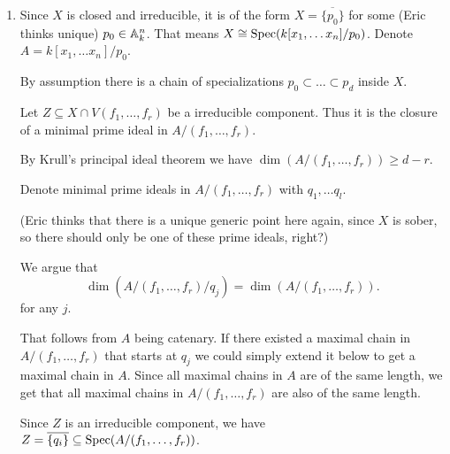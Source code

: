 \newcommand{\sheet}{10}




\maketitle{}

\begin{exercise}{1}
    \begin{enumerate}
        \item{
                Since $X$ is closed and irreducible, it is of the form $X =
                \overline{\{p_0\}}$ for some (Eric thinks unique) $p_0 \in \mathbb{A}^n_k$.
                That means $X \cong \operatorname{Spec}(k[x_1, \dots x_n] / p_0)$.
                Denote $A = k[x_1, \dots x_n] / p_0$.

                By assumption there is a chain of specializations $p_0 \subset
                \dots \subset p_d$ inside $X$.

                Let $Z \subseteq X \cap V(f_1, \dots, f_r)$ be a irreducible
                component. Thus it is the closure of a minimal prime ideal in $A
                / (f_1, \dots, f_r)$.

                By Krull's principal ideal theorem we have $\dim(A / (f_1,
                \dots, f_r)) \geq d - r$.

                Denote minimal prime ideals in $A / (f_1, \dots, f_r)$ with
                $q_1, \dots q_l$.

                (Eric thinks that there is a unique generic point here again, since $X$ is sober, so 
                there should only be one of these prime ideals, right?)
                
                We argue that
                \begin{equation*}
                    \dim(A / (f_1, \dots, f_r) / q_j) = \dim(A / (f_1, \dots, f_r)).
                \end{equation*}
                for any $j$.

                That follows from $A$ being catenary.
                If there existed a maximal chain in $A / (f_1, \dots, f_r)$ that
                starts at $q_j$ we could simply extend it below to get a
                maximal chain in $A$. Since all maximal chains in $A$ are of the
                same length, we get that all maximal chains in $A / (f_1, \dots,
                f_r)$ are also of the same length.

                Since $Z$ is an irreducible component, we have $Z =
                \overline{\{q_i\}} \subseteq \operatorname{Spec}(A / (f_1, \dots, f_r))$.

}
\end{enumerate}
\end{exercise}
